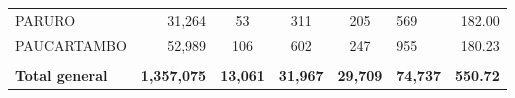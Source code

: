 \begin{tabular}{lrccclr}
		\cellcolor[HTML]{C6E0B4}PARURO                                 & 31,264                                                         & 53                                                          & 311                  & 205                      & 569                                                                 & 182.00                                                                       \\
		\cellcolor[HTML]{C6E0B4}PAUCARTAMBO                            & 52,989                                                         & 106                                                         & 602                  & 247                      & 955                                                                 & 180.23                                                                       \\
		& \multicolumn{1}{l}{}                                           & \multicolumn{1}{l}{}                                        & \multicolumn{1}{l}{} & \multicolumn{1}{l}{}     &                                                                     & \multicolumn{1}{l}{}                                                         \\
		\rowcolor[HTML]{DDEBF7} 
		\textbf{Total   general}                                       & \textbf{1,357,075}                                             & \multicolumn{1}{r}{\cellcolor[HTML]{DDEBF7}\textbf{13,061}} & \textbf{31,967}      & \textbf{29,709}          & \textbf{74,737}                                                     & \textbf{550.72}                                                             
	\end{tabular}
